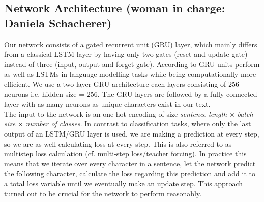 \documentclass[11pt,a4paper,bibliography=totocnumbered,listof=totocnumbered]{scrartcl}
\begin{document}
\subsection{Network Architecture \small{(woman in charge: Daniela Schacherer)}} \label{ssec:na}
Our network consists of a gated recurrent unit (GRU) layer, which mainly differs from a classical LSTM layer by having only two gates (reset and update gate) instead of three (input, output and forget gate). According to GRU units perform as well as LSTMs in language modelling tasks while being computationally more efficient. We use a two-layer GRU architecture each layers consisting of 256 neurons i.e. hidden size = 256. The GRU layers are followed by a fully connected layer with as many neurons as unique characters exist in our text. \\
The input to the network is an one-hot encoding of size \textit{sentence length} $\times$ \textit{batch size} $\times$ \textit{number of classes}. In contrast to classification tasks, where only the last output of an LSTM/GRU layer is used, we are making a prediction at every step, so we are as well calculating loss at every step. This is also referred to as multistep loss calculation (cf. multi-step loss/teacher forcing). In practice this means that we iterate over every character in a sentence, let the network predict the following character, calculate the loss regarding this prediction and add it to a total loss variable until we eventually make an update step. This approach turned out to be crucial for the network to perform reasonably.
\end{document}
